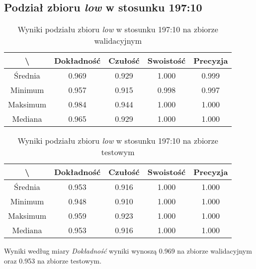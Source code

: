 \subsection{Podział zbioru \textit{low} w stosunku 197:10}


\begin{table}[H]
	\centering
	\caption{Wyniki podziału zbioru \textit{low} w stosunku 197:10 na zbiorze walidacyjnym}
	\vspace{6pt}
	{\footnotesize
		\begin{tabular}{|c|c|c|c|c|}
      \hline \textbackslash & Dokładność & Czułość & Swoistość & Precyzja \\
      \hline Średnia & 0.969 & 0.929 & 1.000 & 0.999 \\
      \hline Minimum & 0.957 & 0.915 & 0.998 & 0.997 \\
      \hline Maksimum & 0.984 & 0.944 & 1.000 & 1.000 \\
      \hline Mediana & 0.965 & 0.929 & 1.000 & 1.000 \\
      \hline
    \end{tabular}
    \label{Tab:lowsplita_val}
	}
	\vspace{0pt}
\end{table}

\begin{table}[H]
	\centering
	\caption{Wyniki podziału zbioru \textit{low} w stosunku 197:10 na zbiorze testowym}
	\vspace{6pt}
	{\footnotesize
		\begin{tabular}{|c|c|c|c|c|}
      \hline \textbackslash & Dokładność & Czułość & Swoistość & Precyzja \\
      \hline Średnia & 0.953 & 0.916 & 1.000 & 1.000 \\
      \hline Minimum & 0.948 & 0.910 & 1.000 & 1.000 \\
      \hline Maksimum & 0.959 & 0.923 & 1.000 & 1.000 \\
      \hline Mediana & 0.953 & 0.916 & 1.000 & 1.000 \\
      \hline
    \end{tabular}
    \label{Tab:lowsplita_test}
	}
	\vspace{0pt}
\end{table}

Wyniki według miary \textit{Dokładność} wyniki wynoszą 0.969 na zbiorze walidacyjnym oraz 0.953 na zbiorze testowym.
